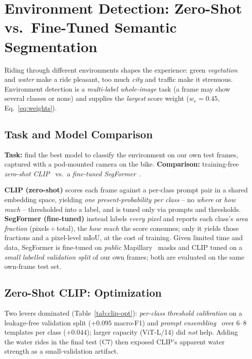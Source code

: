 \documentclass[letterpaper,journal]{IEEEtran}
\begin{document}
\clearpage
\section{Environment Detection: Zero-Shot vs.\ Fine-Tuned
Semantic Segmentation}

Riding through different environments shapes the experience: green \emph{vegetation}
and \emph{water} make a ride pleasant, too much \emph{city} and traffic make it
strenuous. Environment detection is a \emph{multi-label whole-image} task (a frame may
show several classes or none) and supplies the \emph{largest} score weight
($w_e = 0.45$, Eq.~\eqref{eq:weights}).

\subsection{Task and Model Comparison}
\textbf{Task:} find the best model to classify the environment on our own test frames,
captured with a pod-mounted camera on the bike. \textbf{Comparison:} training-free
\emph{zero-shot CLIP}~\cite{clip} vs.\ a \emph{fine-tuned
SegFormer}~\cite{segformer}.

\textbf{CLIP (zero-shot)} scores each frame against a per-class prompt pair in a shared
embedding space, yielding \emph{one present-probability per class} -- no \emph{where} or
\emph{how much} -- thresholded into a label, and is tuned only via prompts and
thresholds. \textbf{SegFormer (fine-tuned)} instead labels \emph{every pixel} and
reports each class's \emph{area fraction} (pixels\,$\div$\,total), the \emph{how much}
the score consumes; only it yields those fractions and a pixel-level mIoU, at the cost
of training. Given limited time and data, SegFormer is fine-tuned on \emph{public}
Mapillary~\cite{mapillaryvistas} masks and CLIP tuned on a \emph{small labelled
validation split} of our own frames; both are evaluated on the same own-frame test set.

\subsection{Zero-Shot CLIP: Optimization}
Two levers dominated (Table~\ref{tab:clip-opt}): \emph{per-class threshold calibration}
on a leakage-free validation split ($+0.095$ macro-F1) and \emph{prompt
ensembling}~\cite{clip} over 6--8 templates per class ($+0.044$); larger capacity
(ViT-L/14) did \emph{not} help. Adding the water rides in the final test (C7) then
exposed CLIP's apparent water strength as a small-validation artifact.
\end{document}
